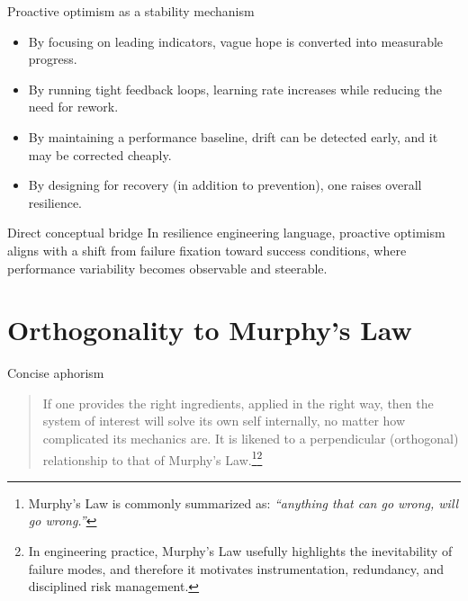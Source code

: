 \documentclass[presentation,aspectratio=169,11pt]{beamer}
\begin{document}
\begin{frame}{Proactive optimism as a stability mechanism}
\justifying
\begin{itemize}
  \item By focusing on leading indicators, vague hope is converted into measurable progress.
  \item By running tight feedback loops, learning rate increases while reducing the need for rework.
  \item By maintaining a performance baseline, drift can be detected early, and it may be corrected cheaply.
  \item By designing for recovery (in addition to prevention), one raises overall resilience.
\end{itemize}

\vspace{0.6em}
\begin{block}{Direct conceptual bridge}
\justifying
In resilience engineering language, proactive optimism aligns with a shift from failure fixation toward success conditions, where performance variability becomes observable and steerable.
\end{block}
\end{frame}

\section{Orthogonality to Murphy's Law}

\begin{frame}{Concise aphorism}
\justifying
\Large
\begin{quote}
If one provides the right ingredients, applied in the right way, then the system of interest will solve its own self internally, no matter how complicated its mechanics are. It is likened to a perpendicular (orthogonal) relationship to that of Murphy's Law.\footnote{Murphy's Law is commonly summarized as: \emph{``anything that can go wrong, will go wrong.''}}\footnote{In engineering practice, Murphy's Law usefully highlights the inevitability of failure modes, and therefore it motivates instrumentation, redundancy, and disciplined risk management.}
\end{quote}
\end{frame}
\end{document}
